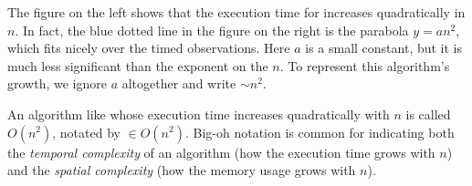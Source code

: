 The figure on the left shows that the execution time for  increases quadratically in $n$.
In fact, the blue dotted line in the figure on the right is the parabola $y = an^2$, which fits nicely over the timed observations. Here $a$ is a small constant, but it is much less significant than the exponent on the $n$.
To represent this algorithm's growth, we ignore $a$ altogether and write  $\sim n^2$.

\begin{info} %
An algorithm like  whose execution time increases quadratically with $n$ is called $O(n^2)$, notated by  $\in O(n^2)$.
Big-oh notation is common for indicating both the \emph{temporal complexity} of an algorithm (how the execution time grows with $n$) and the \emph{spatial complexity} (how the memory usage grows with $n$).
\end{info}

\newpage

